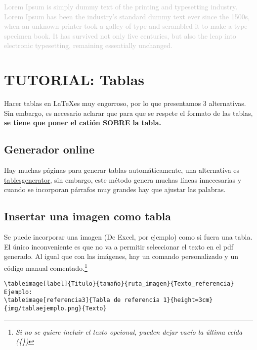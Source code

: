 

\textcolor{silver}{
    Lorem Ipsum is simply dummy text of the printing and typesetting industry. Lorem Ipsum has been the industry's standard dummy text ever since the 1500s, when an unknown printer took a galley of type and scrambled it to make a type specimen book. It has survived not only five centuries, but also the leap into electronic typesetting, remaining essentially unchanged.
    }

\newpage

\section{TUTORIAL: Tablas}

Hacer tablas en \LaTeX es muy engorroso, por lo que presentamos 3 alternativas. Sin embargo, es necesario aclarar que para que se respete el formato de las tablas, \textbf{se tiene que poner el catión SOBRE la tabla.}

\subsection{Generador online}
Hay muchas páginas para generar tablas automáticamente, una alternativa es \href{https://www.tablesgenerator.com}{tablesgenerator}, sin embargo, este método genera muchas líneas innecesarias y cuando se incorporan párrafos muy grandes hay que ajustar las palabras.

\subsection{Insertar una imagen como tabla}
Se puede incorporar una imagen (De Excel, por ejemplo) como si fuera una tabla. El único inconveniente es que no va a permitir seleccionar el texto en el pdf generado. Al igual que con las imágenes, hay un comando personalizado y un código manual comentado.\footnote{\textit{Si no se quiere incluir el texto opcional, pueden dejar vacío la última celda (\{\})}}
\begin{verbatim}
\tableimage[label]{Titulo}{tamaño}{ruta_imagen}{Texto_referencia}
Ejemplo:
\tableimage[referencia3]{Tabla de referencia 1}{height=3cm}{img/tablaejemplo.png}{Texto}
\end{verbatim}



